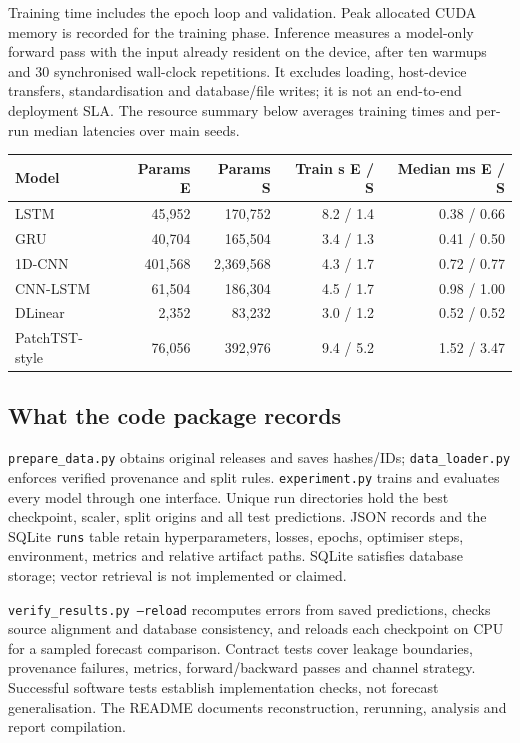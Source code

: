 \documentclass[10pt,a4paper]{article}
\begin{document}
Training time includes the epoch loop and validation. Peak allocated CUDA memory is recorded for the training phase. Inference measures a model-only forward pass with the input already resident on the device, after ten warmups and 30 synchronised wall-clock repetitions. It excludes loading, host-device transfers, standardisation and database/file writes; it is not an end-to-end deployment SLA. The resource summary below averages training times and per-run median latencies over main seeds.\par
\begin{center}\small
\begin{tabular}{lrrrr}\toprule
Model & Params E & Params S & Train s E / S & Median ms E / S\\\midrule
LSTM & 45,952 & 170,752 & 8.2 / 1.4 & 0.38 / 0.66\\
GRU & 40,704 & 165,504 & 3.4 / 1.3 & 0.41 / 0.50\\
1D-CNN & 401,568 & 2,369,568 & 4.3 / 1.7 & 0.72 / 0.77\\
CNN-LSTM & 61,504 & 186,304 & 4.5 / 1.7 & 0.98 / 1.00\\
DLinear & 2,352 & 83,232 & 3.0 / 1.2 & 0.52 / 0.52\\
PatchTST-style & 76,056 & 392,976 & 9.4 / 5.2 & 1.52 / 3.47\\
\bottomrule\end{tabular}\end{center}

\subsection{What the code package records}
\texttt{prepare\_data.py} obtains original releases and saves hashes/IDs; \texttt{data\_loader.py} enforces verified provenance and split rules. \texttt{experiment.py} trains and evaluates every model through one interface. Unique run directories hold the best checkpoint, scaler, split origins and all test predictions. JSON records and the SQLite \texttt{runs} table retain hyperparameters, losses, epochs, optimiser steps, environment, metrics and relative artifact paths. SQLite satisfies database storage; vector retrieval is not implemented or claimed.

\texttt{verify\_results.py --reload} recomputes errors from saved predictions, checks source alignment and database consistency, and reloads each checkpoint on CPU for a sampled forecast comparison. Contract tests cover leakage boundaries, provenance failures, metrics, forward/backward passes and channel strategy. Successful software tests establish implementation checks, not forecast generalisation. The README documents reconstruction, rerunning, analysis and report compilation.
\end{document}
